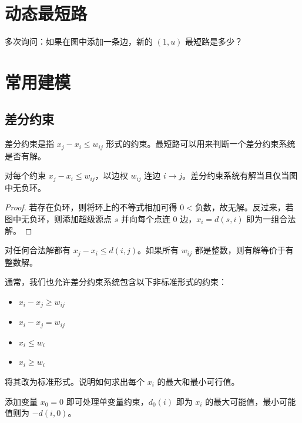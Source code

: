 \section{动态最短路}

\begin{example}
    多次询问：如果在图中添加一条边，新的 $(1,u)$ 最短路是多少？
\end{example}



\section{常用建模}

\subsection{差分约束}

差分约束是指 $x_j-x_i\le w_{ij}$ 形式的约束。最短路可以用来判断一个差分约束系统是否有解。

\begin{theorem}
    对每个约束 $x_j-x_i\le w_{ij}$，以边权 $w_{ij}$ 连边 $i\to j$。差分约束系统有解当且仅当图中无负环。
\end{theorem}
\begin{proof}
    若存在负环，则将环上的不等式相加可得 $0<\text{负数}$，故无解。反过来，若图中无负环，则添加超级源点 $s$ 并向每个点连 $0$ 边，$x_i=d(s,i)$ 即为一组合法解。
\end{proof}
\begin{corollary}
    对任何合法解都有 $x_j-x_i\le d(i,j)$。如果所有 $w_{ij}$ 都是整数，则有解等价于有整数解。
\end{corollary}


\begin{exercise}
    通常，我们也允许差分约束系统包含以下非标准形式的约束：
    \begin{itemize}
        \item $x_i-x_j\ge w_{ij}$
        \item $x_i-x_j=w_{ij}$
        \item $x_i\le w_i$
        \item $x_i\ge w_i$
    \end{itemize}
    将其改为标准形式。说明如何求出每个 $x_i$ 的最大和最小可行值。
\end{exercise}
\begin{solution}
    添加变量 $x_0=0$ 即可处理单变量约束，$d_0(i)$ 即为 $x_i$ 的最大可能值，最小可能值则为 $-d(i,0)$。 
\end{solution}

